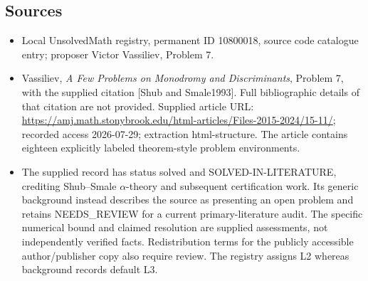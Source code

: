 \documentclass[11pt]{article}
\begin{document}
\subsection{Sources}
\begin{itemize}
\item Local UnsolvedMath registry, permanent ID 10800018, source code catalogue entry; proposer Victor Vassiliev, Problem 7.
\item Vassiliev, \emph{A Few Problems on Monodromy and Discriminants}, Problem 7, with the supplied citation [Shub and Smale1993]. Full bibliographic details of that citation are not provided. Supplied article URL: \url{https://amj.math.stonybrook.edu/html-articles/Files-2015-2024/15-11/}; recorded access 2026-07-29; extraction html-structure. The article contains eighteen explicitly labeled theorem-style problem environments.
\item The supplied record has status solved and SOLVED-IN-LITERATURE, crediting Shub--Smale \(\alpha\)-theory and subsequent certification work. Its generic background instead describes the source as presenting an open problem and retains NEEDS\_REVIEW for a current primary-literature audit. The specific numerical bound and claimed resolution are supplied assessments, not independently verified facts. Redistribution terms for the publicly accessible author/publisher copy also require review. The registry assigns L2 whereas background records default L3.
\end{itemize}
\end{document}
